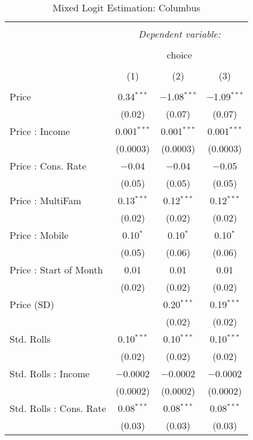 
\begin{table}[!htbp] \centering 
  \caption{Mixed Logit Estimation: Columbus} 
  \label{tab:mnlColumbusRandCoef} 
\begin{tabular}{@{\extracolsep{5pt}}lccc} 
\\[-1.8ex]\hline 
\hline \\[-1.8ex] 
 & \multicolumn{3}{c}{\textit{Dependent variable:}} \\ 
\cline{2-4} 
\\[-1.8ex] & \multicolumn{3}{c}{choice} \\ 
\\[-1.8ex] & (1) & (2) & (3)\\ 
\hline \\[-1.8ex] 
 Price & 0.34$^{***}$ & $-$1.08$^{***}$ & $-$1.09$^{***}$ \\ 
  & (0.02) & (0.07) & (0.07) \\ 
  Price : Income & 0.001$^{***}$ & 0.001$^{***}$ & 0.001$^{***}$ \\ 
  & (0.0003) & (0.0003) & (0.0003) \\ 
  Price : Cons. Rate & $-$0.04 & $-$0.04 & $-$0.05 \\ 
  & (0.05) & (0.05) & (0.05) \\ 
  Price : MultiFam & 0.13$^{***}$ & 0.12$^{***}$ & 0.12$^{***}$ \\ 
  & (0.02) & (0.02) & (0.02) \\ 
  Price : Mobile & 0.10$^{*}$ & 0.10$^{*}$ & 0.10$^{*}$ \\ 
  & (0.05) & (0.06) & (0.06) \\ 
  Price : Start of Month & 0.01 & 0.01 & 0.01 \\ 
  & (0.02) & (0.02) & (0.02) \\ 
  Price (SD) &  & 0.20$^{***}$ & 0.19$^{***}$ \\ 
  &  & (0.02) & (0.02) \\ 
  Std. Rolls & 0.10$^{***}$ & 0.10$^{***}$ & 0.10$^{***}$ \\ 
  & (0.02) & (0.02) & (0.02) \\ 
  Std. Rolls : Income & $-$0.0002 & $-$0.0002 & $-$0.0002 \\ 
  & (0.0002) & (0.0002) & (0.0002) \\ 
  Std. Rolls : Cons. Rate & 0.08$^{***}$ & 0.08$^{***}$ & 0.08$^{***}$ \\ 
  & (0.03) & (0.03) & (0.03) \\ 

\end{tabular}
\end{table}
